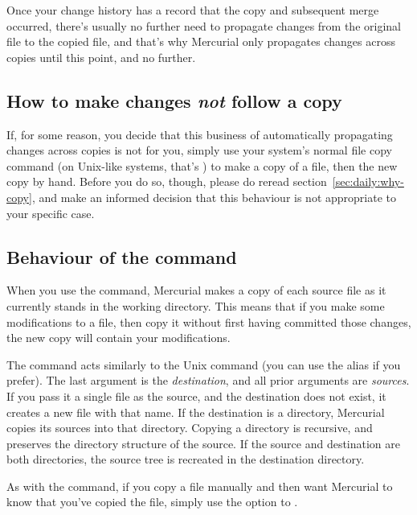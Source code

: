 Once your change history has a record that the copy and subsequent
merge occurred, there's usually no further need to propagate changes
from the original file to the copied file, and that's why Mercurial
only propagates changes across copies until this point, and no
further.

\subsection{How to make changes \emph{not} follow a copy}

If, for some reason, you decide that this business of automatically
propagating changes across copies is not for you, simply use your
system's normal file copy command (on Unix-like systems, that's
) to make a copy of a file, then  the new copy
by hand.  Before you do so, though, please do reread
section~\ref{sec:daily:why-copy}, and make an informed decision that
this behaviour is not appropriate to your specific case.

\subsection{Behaviour of the  command}

When you use the  command, Mercurial makes a copy of each
source file as it currently stands in the working directory.  This
means that if you make some modifications to a file, then copy it
without first having committed those changes, the new copy will
contain your modifications.

The  command acts similarly to the Unix 
command (you can use the  alias if you prefer).  The last
argument is the \emph{destination}, and all prior arguments are
\emph{sources}.  If you pass it a single file as the source, and the
destination does not exist, it creates a new file with that name.
If the destination is a directory, Mercurial copies its sources into
that directory.
Copying a directory is recursive, and preserves the directory
structure of the source.
If the source and destination are both directories, the source tree is
recreated in the destination directory.

As with the  command, if you copy a file manually and
then want Mercurial to know that you've copied the file, simply use
the  option to .

